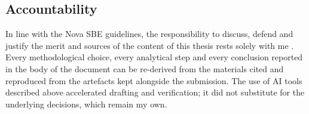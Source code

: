 \subsection*{Accountability}

In line with the Nova SBE guidelines, the responsibility to discuss, defend
and justify the merit and sources of the content of this thesis rests solely
with me \citep{novasbe-genai}. Every methodological choice, every
analytical step and every conclusion reported in the body of the document can
be re-derived from the materials cited and reproduced from the artefacts kept
alongside the submission. The use of AI tools described above accelerated
drafting and verification; it did not substitute for the underlying decisions,
which remain my own.